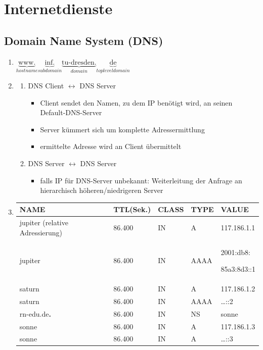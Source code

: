 \section{Internetdienste}
\subsection{Domain Name System (DNS)}
\begin{enumerate}
	\item $\underbrace{\text{www.}}_{hostname}\underbrace{\text{inf.}}_{subdomain}\underbrace{\text{tu-dresden.}}_{domain}\underbrace{\text{de}}_{top level domain}$
	\item
	\begin{enumerate}
		\item DNS Client $\leftrightarrow$ DNS Server
		\begin{itemize}
			\item Client sendet den Namen, zu dem IP benötigt wird, an seinen Default-DNS-Server
			\item Server kümmert sich um komplette Adressermittlung
			\item ermittelte Adresse wird an Client übermittelt
		\end{itemize}
		\item DNS Server $\leftrightarrow$ DNS Server
		\begin{itemize}
			\item falls IP für DNS-Server unbekannt: Weiterleitung der Anfrage an hierarchisch höheren/niedrigeren Server
		\end{itemize}
	\end{enumerate}
	\item 
	\begin{tabularx}{\textwidth}{|X|X|X|X|X|}
	\hline 
	NAME &TTL(Sek.) &CLASS &TYPE &VALUE\\
	\hline
	jupiter (relative Adressierung) & 86.400 &IN &A &117.186.1.1\\
	\hline
	jupiter & 86.400 &IN &AAAA &2001:db8:\par 85a3:8d3::1 \\
	\hline
	saturn &86.400 &IN &A & 117.186.1.2\\
	\hline
	saturn &86.400 &IN &AAAA & \ldots ::2\\
	\hline
	rn-edu.de\textbf{.} &86.400 &IN &NS &sonne\\
	\hline
	sonne &86.400 &IN &A & 117.186.1.3\\
	\hline
	sonne &86.400 &IN &A & \ldots ::3\\

\end{tabularx}
\end{enumerate}
